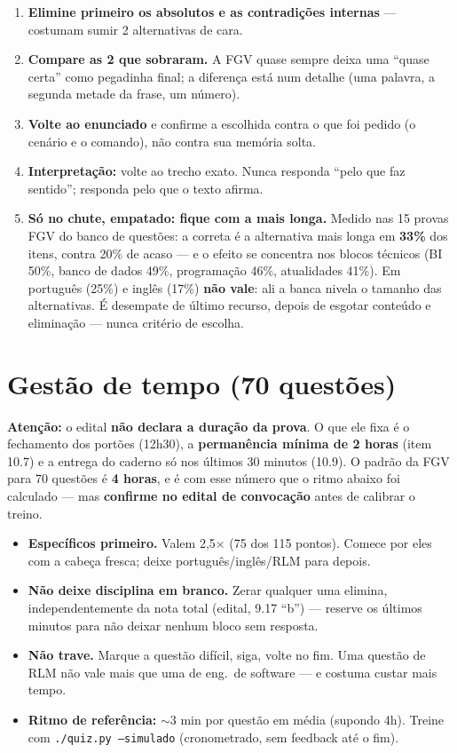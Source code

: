 \begin{enumerate}
\item \textbf{Elimine primeiro os absolutos e as contradições internas} ---
costumam sumir 2 alternativas de cara.
\item \textbf{Compare as 2 que sobraram.} A FGV quase sempre deixa uma
``quase certa'' como pegadinha final; a diferença está num detalhe (uma
palavra, a segunda metade da frase, um número).
\item \textbf{Volte ao enunciado} e confirme a escolhida contra o que foi
pedido (o cenário e o comando), não contra sua memória solta.
\item \textbf{Interpretação:} volte ao trecho exato. Nunca responda ``pelo
que faz sentido''; responda pelo que o texto afirma.
\item \textbf{Só no chute, empatado: fique com a mais longa.} Medido nas 15
provas FGV do banco de questões: a correta é a alternativa mais longa em
\textbf{33\%} dos itens, contra 20\% de acaso --- e o efeito se concentra nos
blocos técnicos (BI 50\%, banco de dados 49\%, programação 46\%, atualidades
41\%). Em português (25\%) e inglês (17\%) \textbf{não vale}: ali a banca
nivela o tamanho das alternativas. É desempate de último recurso, depois de
esgotar conteúdo e eliminação --- nunca critério de escolha.
\end{enumerate}

\section{Gestão de tempo (70 questões)}

\textbf{Atenção:} o edital \textbf{não declara a duração da prova}. O que ele
fixa é o fechamento dos portões (12h30), a \textbf{permanência mínima de 2
horas} (item 10.7) e a entrega do caderno só nos últimos 30 minutos (10.9). O
padrão da FGV para 70 questões é \textbf{4 horas}, e é com esse número que o
ritmo abaixo foi calculado --- mas \textbf{confirme no edital de convocação}
antes de calibrar o treino.

\begin{comosair}
\begin{itemize}
\item \textbf{Específicos primeiro.} Valem 2,5$\times$ (75 dos 115 pontos).
Comece por eles com a cabeça fresca; deixe português/inglês/RLM para depois.
\item \textbf{Não deixe disciplina em branco.} Zerar qualquer uma elimina,
independentemente da nota total (edital, 9.17 ``b'') --- reserve os últimos
minutos para não deixar nenhum bloco sem resposta.
\item \textbf{Não trave.} Marque a questão difícil, siga, volte no fim. Uma
questão de RLM não vale mais que uma de eng.\ de software --- e costuma
custar mais tempo.
\item \textbf{Ritmo de referência:} ${\sim}$3 min por questão em média
(supondo 4h). Treine com \texttt{./quiz.py --simulado} (cronometrado, sem
feedback até o fim).
\end{itemize}
\end{comosair}


